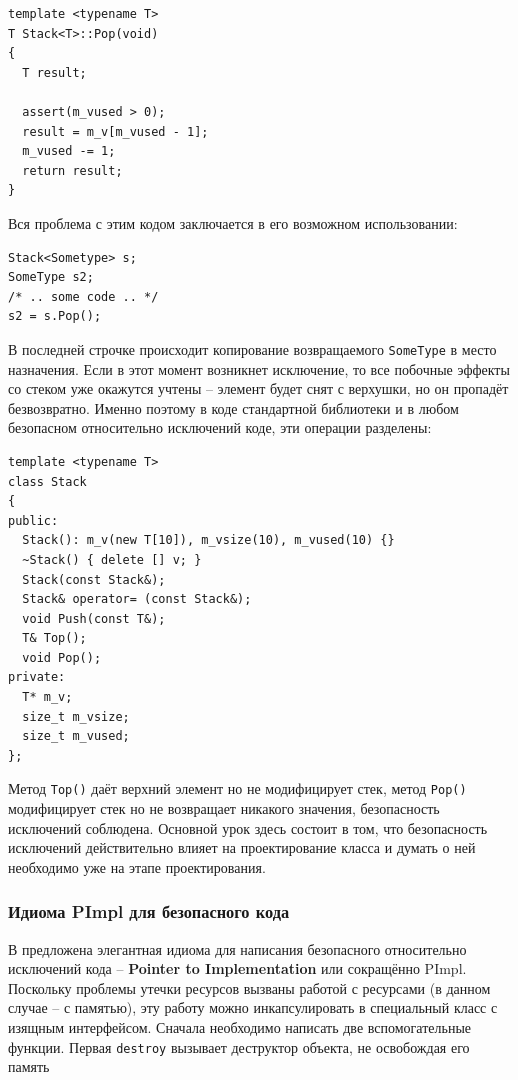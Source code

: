 \documentclass[a4paper,12pt,oneside]{article}
\begin{document}
\begin{lstlisting}
template <typename T>
T Stack<T>::Pop(void)
{
  T result;

  assert(m_vused > 0);
  result = m_v[m_vused - 1];
  m_vused -= 1;
  return result;
}
\end{lstlisting}

Вся проблема с этим кодом заключается в его возможном использовании:

\begin{lstlisting}
Stack<Sometype> s;
SomeType s2;
/* .. some code .. */
s2 = s.Pop();
\end{lstlisting}

В последней строчке происходит копирование возвращаемого \lstinline!SomeType! в место назначения. Если в этот момент возникнет исключение, то все побочные эффекты со стеком уже окажутся учтены -- элемент будет снят с верхушки, но он пропадёт безвозвратно. Именно поэтому в коде стандартной библиотеки и в любом безопасном относительно исключений коде, эти операции разделены:

\begin{lstlisting}
template <typename T> 
class Stack
{
public:
  Stack(): m_v(new T[10]), m_vsize(10), m_vused(10) {}
  ~Stack() { delete [] v; }
  Stack(const Stack&);
  Stack& operator= (const Stack&);
  void Push(const T&);
  T& Top();
  void Pop();
private:
  T* m_v;
  size_t m_vsize;
  size_t m_vused;
};
\end{lstlisting}

Метод \lstinline!Top()! даёт верхний элемент но не модифицирует стек, метод \lstinline!Pop()! модифицирует стек но не возвращает никакого значения, безопасность исключений соблюдена. Основной урок здесь состоит в том, что безопасность исключений действительно влияет на проектирование класса и думать о ней необходимо уже на этапе проектирования.

\subsubsection{Идиома PImpl для безопасного кода}\label{PImpl}

В \cite{exceptionalcpp} предложена элегантная идиома для написания безопасного относительно исключений кода -- \textbf{Pointer to Implementation} или сокращённо PImpl. Поскольку проблемы утечки ресурсов вызваны работой с ресурсами (в данном случае -- с памятью), эту работу можно инкапсулировать в специальный класс с изящным интерфейсом. Сначала необходимо написать две вспомогательные функции. Первая \lstinline!destroy! вызывает деструктор объекта, не освобождая его память
\end{document}
